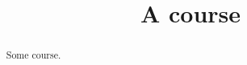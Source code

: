 \documentclass{xourse}
\title{A course}
\begin{document}
\begin{abstract}
  Some course.
\end{abstract}
\maketitle

\end{document}
